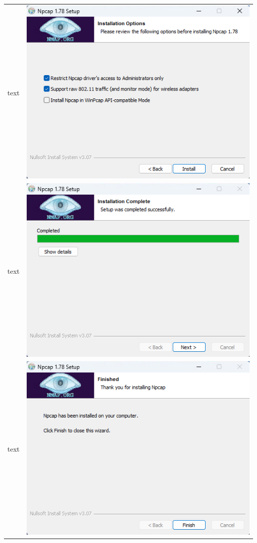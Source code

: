 \documentclass[11pt]{report}
\begin{document}
\begin{tabular}{ l r }
            text & \includegraphics[scale=1.0]{wireshark12} \\
            text & \includegraphics[scale=1.0]{wireshark13} \\
            text & \includegraphics[scale=1.0]{wireshark14} \\

\end{tabular}
\end{document}
